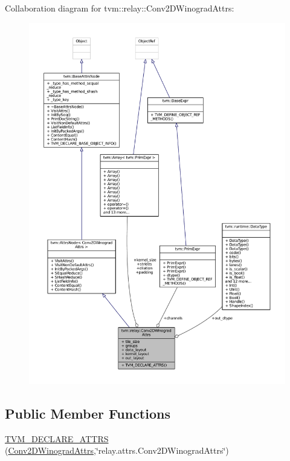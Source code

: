 Collaboration diagram for tvm\+:\+:relay\+:\+:Conv2\+D\+Winograd\+Attrs\+:
\nopagebreak
\begin{figure}[H]
\begin{center}
\leavevmode
\includegraphics[width=350pt]{structtvm_1_1relay_1_1Conv2DWinogradAttrs__coll__graph}
\end{center}
\end{figure}
\subsection*{Public Member Functions}
\begin{DoxyCompactItemize}
\item 
\hyperlink{structtvm_1_1relay_1_1Conv2DWinogradAttrs_a1eb2a5d5d54d08fee80715a4b8728b7e}{T\+V\+M\+\_\+\+D\+E\+C\+L\+A\+R\+E\+\_\+\+A\+T\+T\+RS} (\hyperlink{structtvm_1_1relay_1_1Conv2DWinogradAttrs}{Conv2\+D\+Winograd\+Attrs},\char`\"{}relay.\+attrs.\+Conv2\+D\+Winograd\+Attrs\char`\"{})
\end{DoxyCompactItemize}
